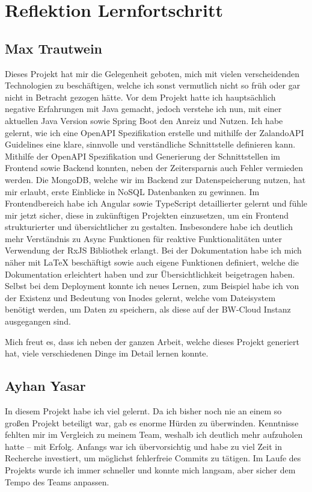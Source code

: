 \chapter{Reflektion Lernfortschritt}\label{ch:reflektion-lernfortschritt}


\section{Max Trautwein}
Dieses Projekt hat mir die Gelegenheit geboten, mich mit vielen verscheidenden Technologien zu beschäftigen,
welche ich sonst vermutlich nicht so früh oder gar nicht in Betracht gezogen hätte.
Vor dem Projekt hatte ich hauptsächlich negative Erfahrungen mit Java gemacht,
jedoch verstehe ich nun, mit einer aktuellen Java Version sowie Spring Boot den Anreiz und Nutzen.
Ich habe gelernt, wie ich eine OpenAPI Spezifikation erstelle und mithilfe der
ZalandoAPI Guidelines eine klare, sinnvolle und verständliche Schnittstelle definieren kann.
Mithilfe der OpenAPI Spezifikation und Generierung der Schnittstellen im Frontend sowie Backend
konnten, neben der Zeitersparnis auch Fehler vermieden werden.
Die MongoDB, welche wir im Backend zur Datenspeicherung nutzen, hat mir erlaubt,
erste Einblicke in NoSQL Datenbanken zu gewinnen.
Im Frontendbereich habe ich Angular sowie \gls{TypeScript} detaillierter gelernt und fühle mir jetzt sicher,
diese in zukünftigen Projekten einzusetzen, um ein Frontend strukturierter und übersichtlicher zu gestalten.
Insbesondere habe ich deutlich mehr Verständnis zu Async Funktionen für reaktive Funktionalitäten
unter Verwendung der RxJS Bibliothek erlangt.
Bei der Dokumentation habe ich mich näher mit LaTeX beschäftigt sowie auch eigene Funktionen definiert,
welche die Dokumentation erleichtert haben und zur Übersichtlichkeit beigetragen haben.
Selbst bei dem Deployment konnte ich neues Lernen, zum Beispiel habe ich von der Existenz und Bedeutung von Inodes gelernt,
welche vom Dateisystem benötigt werden, um Daten zu speichern, als diese auf der BW-Cloud Instanz ausgegangen sind.

Mich freut es, dass ich neben der ganzen Arbeit, welche dieses Projekt generiert hat,
viele verschiedenen Dinge im Detail lernen konnte.


\section{Ayhan Yasar}

In diesem Projekt habe ich viel gelernt. Da ich bisher noch nie an einem so großen Projekt beteiligt war, gab es enorme Hürden zu überwinden. 
Kenntnisse fehlten mir im Vergleich zu meinem Team, weshalb ich deutlich mehr aufzuholen hatte – mit Erfolg. 
Anfangs war ich übervorsichtig und habe zu viel Zeit in Recherche investiert, um möglichst fehlerfreie Commits zu tätigen. 
Im Laufe des Projekts wurde ich immer schneller und konnte mich langsam, aber sicher dem Tempo des Teams anpassen.


